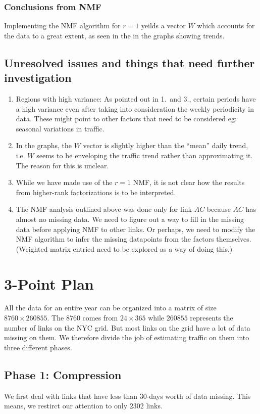\documentclass[10pt,a4paper]{amsart}
\begin{document}
\subsubsection{Conclusions from NMF}
Implementing the NMF algorithm for \(r=1\) yeilds a vector \(W\) which
accounts for the data to a great extent, as seen in the in the graphs showing
trends.

\subsection{Unresolved issues and things that need further investigation}
\begin{enumerate}
	\item Regions with high variance: As pointed out in 1.\ and 3., certain
    		periods have a high variance even after taking into consideration
    		the weekly periodicity in data. These might point to other factors
    		that need to be considered eg: seasonal variations in traffic.
    	\item In the graphs, the \(W\) vector is slightly higher than the
    		``mean'' daily trend, i.e. \(W\) seems to be enveloping the traffic
    		trend rather than approximating it. The reason for this is unclear.
    	\item While we have made use of the \(r=1\) NMF, it is not clear how the
    		results from higher-rank factorizations is to be interpreted.
    	\item The NMF analysis outlined above was done only for link \(AC\)
    		because \(AC\) has almost no missing data. We need to figure out a
    		way to fill in the missing data before applying NMF to other links.
    		Or perhaps, we need to modify the NMF algorithm to infer the missing
    		datapoints from the factors themselves. (Weighted matrix entried
    		need to be explored as a way of doing this.)
\end{enumerate}

\section{3-Point Plan}
All the data for an entire year can be organized into a matrix of size
\(8760\times 260855\). The \(8760\) comes from \(24\times 365\) while
\(260855\) represents the number of links on the NYC grid. But most links
on the grid have a lot of data missing on them. We therefore divide the job
of estimating traffic on them into three different phases.

\subsection{Phase 1: Compression}
We first deal with links that have less than \(30\)-days worth of data
missing. This means, we restirct our attention to only \(2302\) links.
\end{document}
